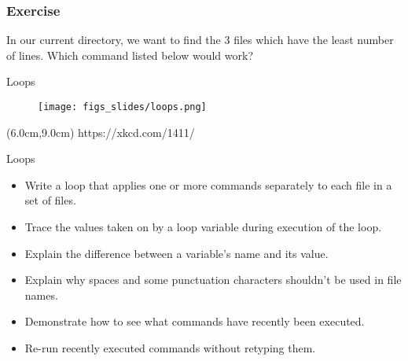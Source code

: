 \documentclass{beamer}
\begin{document}
\begin{frame}
\frametitle{Exercise}
In our current directory, we want to find the 3 files which have the least number of lines. Which command listed below would work?

\end{frame}



\begin{frame}{Loops}

\begin{figure}[htbp]
   \centering
   \texttt{[image: figs\_slides/loops.png]} 
\end{figure}

\begin{textblock*}{7cm}(6.0cm,9.0cm)
		\centering
			\tiny{https://xkcd.com/1411/ }
\end{textblock*}

\end{frame}

\begin{frame}{Loops}
\begin{itemize}
    \item{Write a loop that applies one or more commands separately to each file in a set of files.}
    \item{Trace the values taken on by a loop variable during execution of the loop.}
    \item{Explain the difference between a variable's name and its value.}
    \item{Explain why spaces and some punctuation characters shouldn't be used in file names.}
    \item{Demonstrate how to see what commands have recently been executed.}
    \item{Re-run recently executed commands without retyping them.}
    \end{itemize}
\end{frame}
\end{document}
